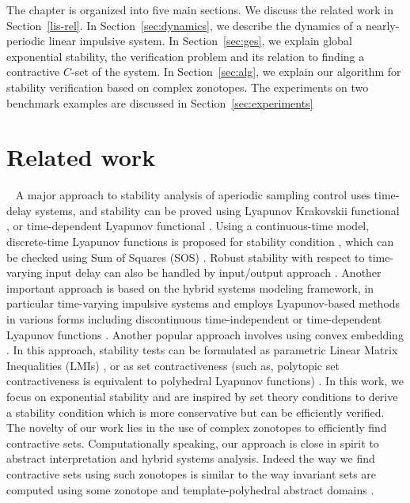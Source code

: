     The chapter is organized into five main sections.  We discuss the
    related work in Section~\ref{lis-rel}.  In
    Section~\ref{sec:dynamics}, we describe the dynamics of a
    nearly-periodic linear impulsive system.  In
    Section~\ref{sec:ges}, we explain global exponential stability,
    the verification problem and its relation to finding a contractive
    $C$-set of the system.  In Section~\ref{sec:alg}, we explain our
    algorithm for stability verification based on complex zonotopes.
    The experiments on two benchmark examples are discussed in Section~\ref{sec:experiments}



\section{Related work}~\label{lis-rel}
A major approach to stability analysis of aperiodic sampling control uses time-delay 
systems, and stability can be proved using Lyapunov Krakovskii functional 
\cite{Mikheev1988,Teel1998,2010-liu-stability,Mazenc2013}, 
or time-dependent Lyapunov functional \cite{2010-fridman-refined}. Using a continuous-time model,  
discrete-time Lyapunov functions is proposed for stability condition \cite{2012-seuret-novel}, 
which can be checked using Sum of Squares (SOS) \cite{2013-seuret-stability}. Robust stability with respect to 
time-varying input delay can also be handled by input/output approach 
\cite{Mirkin2007,DBLP:journals/automatica/Fujioka09,DBLP:conf/amcc/KaoW14,Omran2013,Omran2014}.
Another important approach is based on the hybrid systems modeling framework, in particular time-varying impulsive systems 
\cite{Hu2003,nevsic2004framework,Goebel2009,Cai2008,BauLoo_NECSYS12a} and employs Lyapunov-based 
methods in various forms including discontinuous time-independent \cite{2008-naghshtabrizi-exponential} 
or time-dependent Lyapunov functions \cite{2010-fridman-refined}. Another popular 
approach involves using convex embedding \cite{HetelDaafouz2006,Fujioka2009,HetelKruszewski2011,2013hetel,Omran2014}. 
In this approach, stability tests can be formulated as parametric Linear Matrix Inequalities (LMIs) \cite{HetelDaafouz2006}, 
or as set contractiveness (such as, polytopic set contractiveness is equivalent to polyhedral Lyapunov 
functions) \cite{2014-fiacchini-set,2013-briat-convex,Lazar2013,athanasopoulos2014alternative,AlKhatib2015}. 
In this work, we focus on exponential stability and are inspired by
set theory conditions
\cite{2014-fiacchini-set,athanasopoulos2014alternative,AlKhatib2015} to derive a stability condition which is more conservative 
but can be efficiently verified. The novelty of our work lies in the use of complex zonotopes to efficiently 
find contractive sets. Computationally speaking, our approach is close in spirit to abstract interpretation
and hybrid systems analysis. Indeed the way we find contractive sets using such zonotopes is similar 
to the way invariant sets are computed using some zonotope
\cite{Girard05reachabilityof,Althoff2011,DBLP:conf/sas/GoubaultPV12} and
template-polyhedral abstract domains \cite{Sriram2008,jeannet2009apron}.



